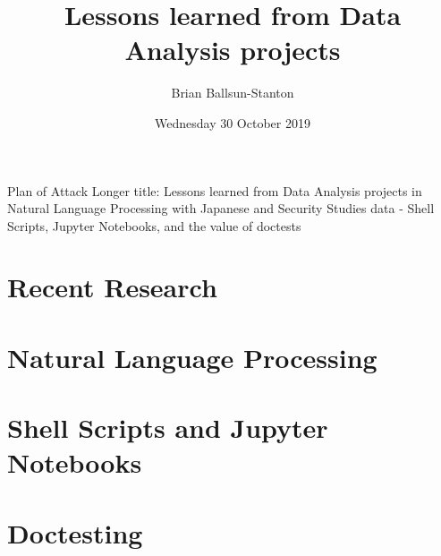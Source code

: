 \documentclass[aspectratio=1610, 11pt]{beamer} %
\title{Lessons learned from Data Analysis projects} %
\author{Brian Ballsun-Stanton}               %
\institute{Faculty of Arts}         %
\date{Wednesday 30 October 2019}                 %
\begin{document}

\maketitle

  

\begin{frame}{Plan of Attack}
Longer title: Lessons learned from Data Analysis projects in Natural Language Processing with Japanese and Security Studies data - Shell Scripts, Jupyter Notebooks, and the value of doctests
  \tableofcontents
\end{frame}

\section{Recent Research}
\section{Natural Language Processing}
\section{Shell Scripts and Jupyter Notebooks}
\section{Doctesting}




\end{document}
